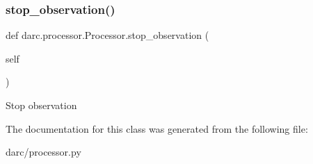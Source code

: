 \subsubsection{\texorpdfstring{stop\_observation()}{stop\_observation()}}
{\footnotesize\ttfamily def darc.\+processor.\+Processor.\+stop\+\_\+observation (\begin{DoxyParamCaption}\item[{}]{self }\end{DoxyParamCaption})}

\begin{DoxyVerb}Stop observation
\end{DoxyVerb}
 

The documentation for this class was generated from the following file\+:\begin{DoxyCompactItemize}
\item 
darc/processor.\+py\end{DoxyCompactItemize}
